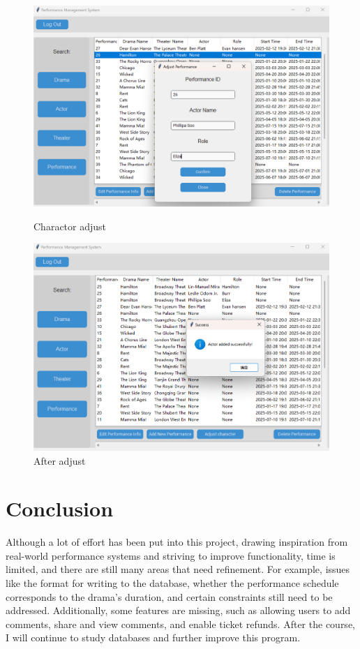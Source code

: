 \documentclass[12pt]{article}
\begin{document}
\begin{figure}[H]
    \centering
    \begin{minipage}{0.48\textwidth}
        \centering
        \includegraphics[width=\textwidth]{45.png}
        \caption{Charactor adjust} 
        \label{Figure 45}
    \end{minipage}
    \hfill
    \begin{minipage}{0.48\textwidth}
        \centering
        \includegraphics[width=\textwidth]{46.png}
        \caption{After adjust}
        \label{Figure 46}
    \end{minipage}
\end{figure}

\section{Conclusion}
\par Although a lot of effort has been put into this project, drawing inspiration from real-world performance systems and striving to improve functionality, time is limited, and there are still many areas that need refinement. For example, issues like the format for writing to the database, whether the performance schedule corresponds to the drama's duration, and certain constraints still need to be addressed. Additionally, some features are missing, such as allowing users to add comments, share and view comments, and enable ticket refunds. After the course, I will continue to study databases and further improve this program.
\end{document}

